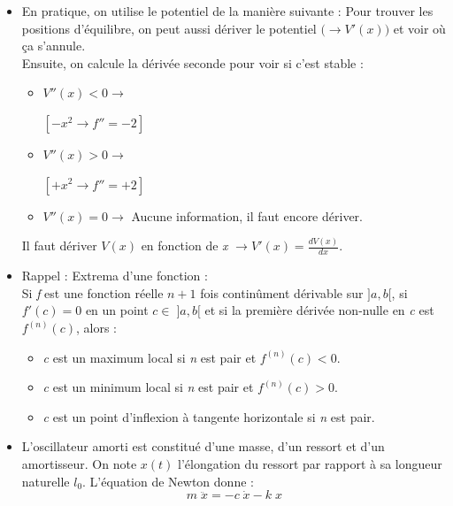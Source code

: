 \documentclass[a4paper]{article}
\begin{document}
\begin{itemize}
\item En pratique, on utilise le potentiel de la manière suivante : Pour trouver les positions d'équilibre, on peut aussi dériver le potentiel $ \big( \rightarrow V'(x) \big) $ et voir où ça s'annule. \\
Ensuite, on calcule la dérivée seconde pour voir si c'est stable : 
\begin{itemize}
\item $ V''(x) < 0 \longrightarrow $ \;  \; $ [ - x^2 \rightarrow f'' = - 2 ] $
\item $ V''(x) > 0 \longrightarrow $ \;  \; $ [ + x^2 \rightarrow f'' = + 2 ] $
\item $ V''(x) = 0 \longrightarrow $ Aucune information, il faut encore dériver.
\end{itemize}
\danger Il faut dériver $ V(x) $ en fonction de \emph{x} $\displaystyle \longrightarrow V'(x) = \frac{d V(x)}{d x} $.





\item Rappel : Extrema d'une fonction : \\
Si \emph{f} est une fonction réelle $ n + 1 $ fois continûment dérivable sur $ ]a, b[ $, si $ f'(c) = 0 $ en un point $ c \in \; ]a, b[ $ et si la première dérivée non-nulle en \emph{c} est $ f^{(n)} (c) $, alors : 
\begin{itemize}
\item \emph{c} est un maximum local si \emph{n} est pair et $ f^{(n)}(c) < 0 $.
\item \emph{c} est un minimum local si \emph{n} est pair et $ f^{(n)}(c) > 0 $.
\item \emph{c} est un point d'inflexion à tangente horizontale si \emph{n} est pair.
\end{itemize}





\item L'oscillateur amorti  est constitué d'une masse, d'un ressort et d'un amortisseur. On note $ x(t) $ l'élongation du ressort par rapport à sa longueur naturelle $ l_0 $. L'équation de Newton donne : 
\[ m \; \ddot{x} = - c \; \dot{x} - k \; x \]


\end{itemize}
\end{document}
